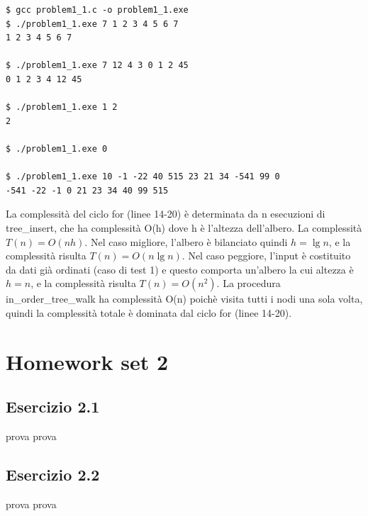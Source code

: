 \documentclass{article}
\begin{document}
\begin{commandline}
\begin{verbatim}
$ gcc problem1_1.c -o problem1_1.exe
$ ./problem1_1.exe 7 1 2 3 4 5 6 7
1 2 3 4 5 6 7

$ ./problem1_1.exe 7 12 4 3 0 1 2 45 
0 1 2 3 4 12 45

$ ./problem1_1.exe 1 2 
2 

$ ./problem1_1.exe 0

$ ./problem1_1.exe 10 -1 -22 40 515 23 21 34 -541 99 0
-541 -22 -1 0 21 23 34 40 99 515
\end{verbatim}
\end{commandline}

\noindent
La complessità del ciclo for (linee 14-20) è determinata da n esecuzioni di tree\_insert, che ha complessità O(h) dove h è l'altezza dell'albero. La complessità $T(n) = O(nh)$. Nel caso migliore, l'albero è bilanciato quindi $h = \lg n$, e la complessità risulta $T(n) = O(n\lg n)$. Nel caso peggiore, l'input è costituito da dati già ordinati (caso di test 1) e questo comporta un'albero la cui altezza è $h = n$, e la complessità risulta $T(n) = O(n^2)$.
La procedura in\_order\_tree\_walk ha complessità O(n) poichè visita tutti i nodi una sola volta, quindi la complessità totale è dominata dal ciclo for (linee 14-20).








\section{Homework set 2} \label{sec:homework_2}%
\subsection{Esercizio 2.1} \label{subsec:esercizio2_1}
prova prova
\subsection{Esercizio 2.2} \label{subsec:esercizio2_2}
prova prova
\end{document}
